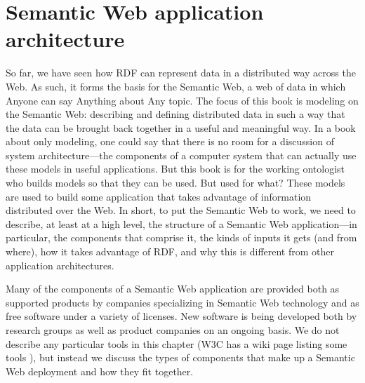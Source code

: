 \chapter{Semantic Web application architecture}
\label{ch4}

So far, we have seen how RDF can represent data in a distributed way
across the Web. As such, it forms the basis for the Semantic Web, a web
of data in which Anyone can say Anything about Any topic. The focus of
this book is modeling on the Semantic Web: describing and defining
distributed data in such a way that the data can be brought back
together in a useful and meaningful way. In a book about only modeling,
one could say that there is no room for a discussion of system
architecture---the components of a computer system that can actually use
these models in useful applications. But this book is for the working
ontologist who builds models so that they can be used. But used for
what? These models are used to build some application that takes
advantage of information distributed over the Web. In short, to put the
Semantic Web to work, we need to describe, at least at a high level, the
structure of a Semantic Web application---in particular, the components
that comprise it, the kinds of inputs it gets (and from where), how it
takes advantage of RDF, and why this is different from other application
architectures.

Many of the components of a Semantic Web application are provided both
as supported products by companies specializing in Semantic Web
technology and as free software under a variety of licenses. New
software is being developed both by research groups as well as product
companies on an ongoing basis. We do not describe any particular tools
in this chapter (W3C has a wiki page listing some tools
\cite{RDFTools}), but instead we discuss the
types of components that make up a Semantic Web deployment and how they
fit together.

